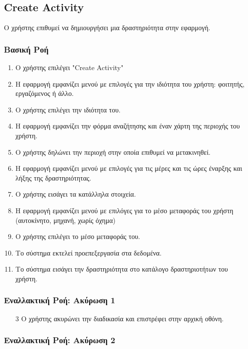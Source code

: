 
\subsection{Create Activity}

Ο χρήστης επιθυμεί να δημιουργήσει μια δραστηριότητα στην εφαρμογή.

\subsubsection{Βασική Ροή}

\begin{enumerate}
    \item Ο χρήστης επιλέγει "Create Activity"
    \item Η εφαρμογή εμφανίζει μενού με επιλογές για την ιδιότητα του χρήστη:
          φοιτητής, εργαζόμενος ή άλλο.
    \item Ο χρήστης επιλέγει την ιδιότητα του.
    \item Η εφαρμογή εμφανίζει την φόρμα αναζήτησης και έναν χάρτη της περιοχής του χρήστη.
    \item Ο χρήστης δηλώνει την περιοχή στην οποία επιθυμεί να μετακινηθεί.
    \item Η εφαρμογή εμφανίζει μενού με επιλογές για τις μέρες και τις ώρες έναρξης και λήξης
          της δραστηριότητας.
    \item Ο χρήστης εισάγει τα κατάλληλα στοιχεία.
    \item H εφαρμογή εμφανίζει μενού με επιλόγες για το μέσο μεταφοράς του χρήστη
          (αυτοκίνητο, μηχανή, χωρίς όχημα)
    \item Ο χρήστης επιλέγει το μέσο μεταφοράς του.
    \item Το σύστημα εκτελεί προεπεξεργασία στα δεδομένα.
    \item Το σύστημα εισάγει την δραστηριότητα στο κατάλογο δραστηριοτήτων του χρήστη.
\end{enumerate}

\subsubsection{Εναλλακτική Ροή: Ακύρωση 1}

\begin{enumerate}
    \item[3] Ο χρήστης ακυρώνει την διαδικασία και επιστρέφει στην αρχική οθόνη.
\end{enumerate}

\subsubsection{Εναλλακτική Ροή: Ακύρωση 2}

